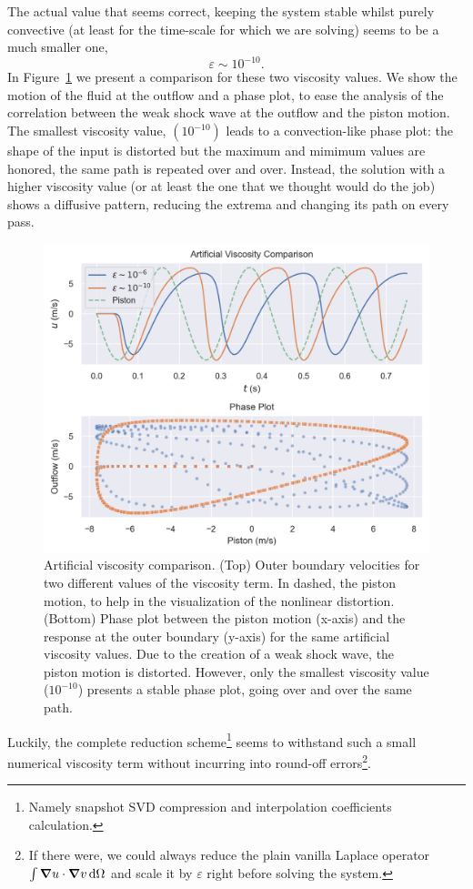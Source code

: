 \documentclass[../../thesis.tex]{subfiles}
\begin{document}
The actual value that seems correct, keeping the system stable whilst purely convective (at least for the time-scale for which we are solving) seems to be a much smaller one,
\begin{equation}
    \varepsilon \sim 10^{-10}.
\end{equation}
In Figure~\ref{fig:artificial_viscosity_comparison} we present a comparison for these two viscosity values.
We show the motion of the fluid at the outflow and a phase plot, to ease the analysis of the correlation between the weak shock wave at the outflow and the piston motion.
The smallest viscosity value, $(10^{-10})$ leads to a convection-like phase plot:
the shape of the input is distorted but the maximum and mimimum values are honored, 
the same path is repeated over and over.
Instead, the solution with a higher viscosity value (or at least the one that we thought would do the job) shows a diffusive pattern, reducing the extrema and changing its path on every pass.
\begin{figure}[!h]
    \centering
    \includegraphics[width=1.0\columnwidth]{research_project/piston/figures/artificial_viscosity/artificial_viscosity_comparison.png}
    \caption{Artificial viscosity comparison.
    (Top) Outer boundary velocities for two different values of the viscosity term.
    In dashed, the piston motion, to help in the visualization of the nonlinear distortion.
    (Bottom) Phase plot between the piston motion (x-axis) and the response at the outer boundary (y-axis) for the same artificial viscosity values.
    Due to the creation of a weak shock wave, the piston motion is distorted.
    However, only the smallest viscosity value ($10^{-10}$) presents a stable phase plot, going over and over the same path. 
    }
    \label{fig:artificial_viscosity_comparison}
\end{figure}
Luckily, the complete reduction scheme\footnote{
    Namely snapshot SVD compression and interpolation coefficients calculation.
}
seems to withstand such a small numerical viscosity term without incurring into round-off errors\footnote{If there were, we could always reduce the plain vanilla Laplace operator $\int \grad u \cdot \grad v \, \text{d}\Omega$ and scale it by $\varepsilon$ right before solving the system.}.
\end{document}
